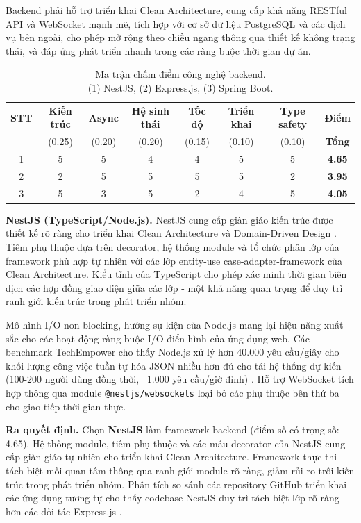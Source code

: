 Backend phải hỗ trợ triển khai Clean Architecture, cung cấp khả năng RESTful API và WebSocket mạnh mẽ, tích hợp với cơ sở dữ liệu PostgreSQL và các dịch vụ bên ngoài, cho phép mở rộng theo chiều ngang thông qua thiết kế không trạng thái, và đáp ứng phát triển nhanh trong các ràng buộc thời gian dự án.

\begin{table}[h]
\centering
\caption{Ma trận chấm điểm công nghệ backend. \\ \small {(1) NestJS,\; (2) Express.js,\; (3) Spring Boot.}}
\small
\begin{tabular}{|c|c|c|c|c|c|c|c|}
\hline
\textbf{STT} & \textbf{Kiến trúc} & \textbf{Async} & \textbf{Hệ sinh thái} &
\textbf{Tốc độ} & \textbf{Triển khai} & \textbf{Type safety} & \textbf{Điểm} \\
 & (0.25) & (0.20) & (0.20) & (0.15) & (0.10) & (0.10) & \textbf{Tổng} \\
\hline
1 & 5 & 5 & 4 & 4 & 5 & 5 & \textbf{4.65} \\
\hline
2 & 2 & 5 & 5 & 5 & 5 & 2 & \textbf{3.95} \\
\hline
3 & 5 & 3 & 5 & 2 & 4 & 5 & \textbf{4.05} \\
\hline
\end{tabular}
\end{table}


\textbf{NestJS (TypeScript/Node.js).} NestJS cung cấp giàn giáo kiến trúc được thiết kế rõ ràng cho triển khai Clean Architecture và Domain-Driven Design \cite{nest2024}. 
Tiêm phụ thuộc dựa trên decorator, hệ thống module và tổ chức phân lớp của framework phù hợp tự nhiên với các lớp entity-use case-adapter-framework của Clean Architecture. 
Kiểu tĩnh của TypeScript cho phép xác minh thời gian biên dịch các hợp đồng giao diện giữa các lớp - một khả năng quan trọng để duy trì ranh giới kiến trúc trong phát triển nhóm.

Mô hình I/O non-blocking, hướng sự kiện của Node.js mang lại hiệu năng xuất sắc cho các hoạt động ràng buộc I/O điển hình của ứng dụng web. 
Các benchmark TechEmpower cho thấy Node.js xử lý hơn 40.000 yêu cầu/giây cho khối lượng công việc tuần tự hóa JSON nhiều hơn đủ cho tải hệ thống dự kiến (100-200 người dùng đồng thời, ~1.000 yêu cầu/giờ đỉnh) \cite{techempower2024}. 
Hỗ trợ WebSocket tích hợp thông qua module \texttt{@nestjs/websockets} loại bỏ các phụ thuộc bên thứ ba cho giao tiếp thời gian thực.

\textbf{Ra quyết định.} Chọn \textbf{NestJS} làm framework backend (điểm số có trọng số: 4.65).
Hệ thống module, tiêm phụ thuộc và các mẫu decorator của NestJS cung cấp giàn giáo tự nhiên cho triển khai Clean Architecture. 
Framework thực thi tách biệt mối quan tâm thông qua ranh giới module rõ ràng, giảm rủi ro trôi kiến trúc trong phát triển nhóm. 
Phân tích so sánh các repository GitHub triển khai các ứng dụng tương tự cho thấy codebase NestJS duy trì tách biệt lớp rõ ràng hơn các đối tác Express.js \cite{nest2024}.

